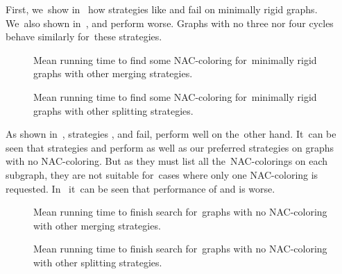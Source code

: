First, we~show in~
how strategies like \Log{} and \PromisingCycles{} fail on minimally rigid graphs.
We~also shown in~,
\KernighanLin{} and \Cuts{} perform worse.
%
Graphs with no three nor four cycles behave similarly for~these strategies.
%
\begin{figure}[thbp]
	\centering
	\scalebox{\BenchFigureScale}{}
	\caption[Other merging strategies for~minimally rigid graphs]{
		Mean running time to find some NAC-coloring for~minimally rigid graphs with other merging strategies.}%
	\label{fig:graph_mimimally_rigid_failing_merging_first_runtime}
\end{figure}%
\begin{figure}[thbp]
	\centering
	\scalebox{\BenchFigureScale}{}
	\caption[Other splitting strategies for~minimally rigid graphs]{
		Mean running time to find some NAC-coloring for~minimally rigid graphs with other splitting strategies.}%
	\label{fig:graph_mimimally_rigid_failing_split_first_runtime}
\end{figure}%


As shown in~,
strategies \Log{}, \SortedBits{} and \MinMax{} fail,
\PromisingCycles{} perform well on the~other hand.
%
It~can be seen that strategies \SortedSize{} and \Score{} perform
as well as our preferred strategies on graphs with no NAC-coloring.
But as they must list all the~NAC-colorings on each subgraph,
they are not suitable for~cases where only one NAC-coloring is requested.
%
In~
it~can be seen that performance of \KernighanLin{} and \Cuts{} is worse.
%
\begin{figure}[thbp]
	\centering
	\scalebox{\BenchFigureScale}{}
	\caption[Other merging strategies for~graphs with no NAC-coloring]{
		Mean running time to finish search for~graphs with no NAC-coloring with other merging strategies.}%
	\label{fig:graph_no_nac_coloring_generated_rigid_failing_merging_first_runtime}
\end{figure}%
\begin{figure}[thbp]
	\centering
	\scalebox{\BenchFigureScale}{}
	\caption[Other splitting strategies for~graphs with no NAC-coloring]{
		Mean running time to finish search for~graphs with no NAC-coloring with other splitting strategies.}%
	\label{fig:graph_no_nac_coloring_generated_rigid_failing_split_first_runtime}
\end{figure}%


